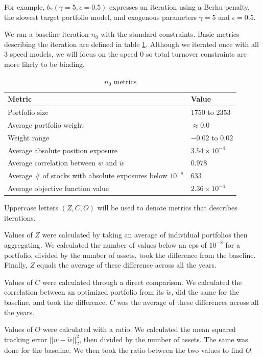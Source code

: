 \documentclass[11pt, letterpaper]{article}
\begin{document}
For example, $b_2(\gamma = 5, \epsilon = 0.5)$ expresses an iteration using a Berhu penalty, the slowest target portfolio model, and exogenous parameters $\gamma = 5$ and $\epsilon = 0.5$.

We ran a baseline iteration $n_0$ with the standard constraints. Basic metrics describing the iteration are defined in table \ref{tab:portfolio_metrics}. Although we iterated once with all $3$ speed models, we will focus on the speed $0$ so total turnover constraints are more likely to be binding.
\begin{table}[h]
\centering
\label{tab:portfolio_metrics}
\caption{$n_0$ metrics}
\begin{tabular}{ll}
\toprule
\textbf{Metric} & \textbf{Value} \\
\midrule
Portfolio size & 1750 to 2353 \\
Average portfolio weight & \(\approx 0.0\) \\
Weight range & \(-0.02\) to \(0.02\) \\
Average absolute position exposure & \(3.54 \times 10^{-4}\) \\
Average correlation between \(w\) and \(\tilde{w}\) & 0.978 \\
Average \# of stocks with absolute exposures below \(10^{-8}\) & 633 \\
Average objective function value & \(2.36 \times 10^{-4}\) \\
\bottomrule
\end{tabular}
\end{table}


Uppercase letters $(Z,C,O)$ will be used to denote metrics that describes iterations.

Values of $Z$ were calculated by taking an average of individual portfolios then aggregating. We calculated the number of values below an eps of $10^{-8}$ for a portfolio, divided by the number of assets, took the difference from the baseline. Finally, $Z$ equals the average of these difference across all the years.

Values of $C$ were calculated through a direct comparison. We calculated the correlation between an optimized portfolio from its $\tilde{w}$, did the same for the baseline, and took the difference. $C$ was the average of these differences across all the years.

Values of $O$ were calculated with a ratio. We calculated the mean squared tracking error $||w - \tilde{w}||^2_2$, then divided by the number of assets. The same was done for the baseline. We then took the ratio between the two values to find $O$.
\end{document}
